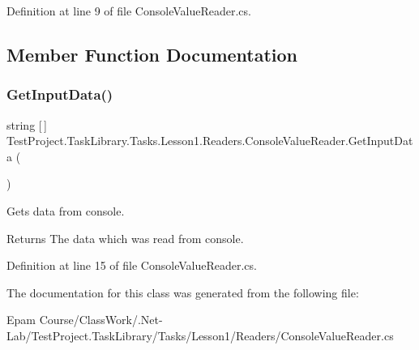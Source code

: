 Definition at line 9 of file Console\+Value\+Reader.\+cs.



\subsection{Member Function Documentation}
\mbox{\label{class_test_project_1_1_task_library_1_1_tasks_1_1_lesson1_1_1_readers_1_1_console_value_reader_a5c6bb9a9efd7fc82aaeae719193eb3d6}} 
\subsubsection{\texorpdfstring{GetInputData()}{GetInputData()}}
{\footnotesize\ttfamily string \mbox{[}$\,$\mbox{]} Test\+Project.\+Task\+Library.\+Tasks.\+Lesson1.\+Readers.\+Console\+Value\+Reader.\+Get\+Input\+Data (\begin{DoxyParamCaption}{ }\end{DoxyParamCaption})}



Gets data from console. 

\begin{DoxyReturn}{Returns}
The data which was read from console.
\end{DoxyReturn}


Definition at line 15 of file Console\+Value\+Reader.\+cs.



The documentation for this class was generated from the following file\+:\begin{DoxyCompactItemize}
\item 
Epam Course/\+Class\+Work/.\+Net-\/\+Lab/\+Test\+Project.\+Task\+Library/\+Tasks/\+Lesson1/\+Readers/Console\+Value\+Reader.\+cs\end{DoxyCompactItemize}
